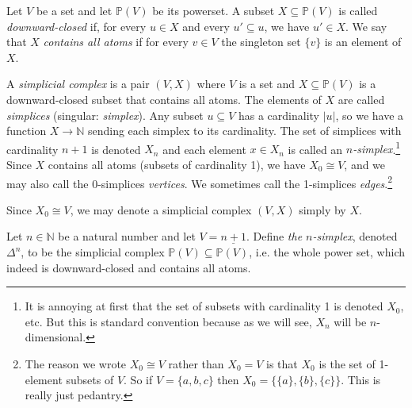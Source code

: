 \documentclass[a4paper]{book}
\def\PP{{\mathbb P}}
\def\NN{{\mathbb N}}
\def\to{\rightarrow}
\def\ss{\subseteq}
\def\iso{\cong}
\def\ul{\underline}
\theoremstyle{myth}
\newtheorem{exampleENG}[envENG]{\begin{english}Example\end{english}}
\newtheorem{definitionENG}[envENG]{\begin{english}Definition\end{english}}
\newtheorem{exampleRUS}[envRUS]{\begin{russian}Пример\end{russian}}
\newtheorem{definitionRUS}[envRUS]{\begin{russian}Определение\end{russian}}
\begin{document}
\begin{english}
\begin{definitionENG}\label{def:simplicial complex}
Let $V$ be a set and let $\PP(V)$ be its powerset. A subset $X\ss\PP(V)$ is called {\em downward-closed} if, for every $u\in X$ and every $u'\ss u$, we have $u'\in X$. We say that $X$ {\em contains all atoms} if for every $v\in V$ the singleton set $\{v\}$ is an element of $X$. 

A {\em simplicial complex} is a pair $(V,X)$ where $V$ is a set and $X\ss\PP(V)$ is a downward-closed subset that contains all atoms. The elements of $X$ are called {\em simplices} (singular: {\em simplex}). Any subset $u\ss V$ has a cardinality $|u|$, so we have a function $X\to\NN$ sending each simplex to its cardinality. The set of simplices with cardinality $n+1$ is denoted $X_n$ and each element $x\in X_n$ is called an {\em $n$-simplex}.\footnote{It is annoying at first that the set of subsets with cardinality 1 is denoted $X_0$, etc. But this is standard convention because as we will see, $X_n$ will be $n$-dimensional.}
Since $X$ contains all atoms (subsets of cardinality 1), we have $X_0\iso V$, and we may also call the 0-simplices {\em vertices}. We sometimes call the 1-simplices {\em edges}.\footnote{The reason we wrote $X_0\iso V$ rather than $X_0=V$ is that $X_0$ is the set of 1-element subsets of $V$. So if $V=\{a,b,c\}$ then $X_0=\{\{a\},\{b\},\{c\}\}$. This is really just pedantry.}

Since $X_0\iso V$, we may denote a simplicial complex $(V,X)$ simply by $X$.
\end{definitionENG}

\begin{definitionRUS}\label{def:simplicial complex}
\begin{russian} \end{russian}
\end{definitionRUS}

\begin{exampleENG}
Let $n\in\NN$ be a natural number and let $V=\ul{n+1}$. Define {\em the $n$-simplex}, denoted $\Delta^n$, to be the simplicial complex $\PP(V)\ss\PP(V)$, i.e. the whole power set, which indeed is downward-closed and contains all atoms. 
\end{exampleENG}

\begin{exampleRUS}
\begin{russian} \end{russian}
\end{exampleRUS}


\end{english}
\end{document}
